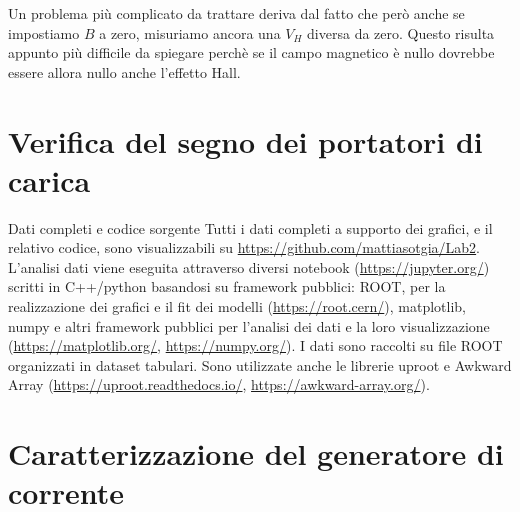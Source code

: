 \documentclass[
    prl,
    reprint, 
    superscriptaddress, 
    altaffilletter, 
    amsmath, 
    amssymb, 
    a4paper,
    varvw]{revtex4-2}
\begin{document}
Un problema più complicato da trattare deriva dal fatto che però anche se impostiamo $B$ a zero, misuriamo ancora una $V_H$ diversa da zero. Questo risulta appunto più difficile da spiegare perchè se il campo magnetico è nullo dovrebbe essere allora nullo anche l'effetto Hall. 





\section{Verifica del segno dei portatori di carica}


\begin{methods}{D\lowercase{ati completi e codice sorgente}}
    Tutti i dati completi a supporto dei grafici, e il relativo codice, sono visualizzabili su \url{https://github.com/mattiasotgia/Lab2}. L'analisi dati viene eseguita attraverso diversi notebook (\url{https://jupyter.org/}) scritti in C++/python basandosi su framework pubblici: ROOT, per la realizzazione dei grafici e il fit dei modelli (\url{https://root.cern/}), matplotlib, numpy e altri framework pubblici per l'analisi dei dati e la loro visualizzazione (\url{https://matplotlib.org/}, \url{https://numpy.org/}). I dati sono raccolti su file ROOT organizzati in dataset tabulari. Sono utilizzate anche le librerie uproot e Awkward Array (\url{https://uproot.readthedocs.io/}, \url{https://awkward-array.org/}).
\end{methods}


\appendix
\section{Caratterizzazione del generatore di corrente}\label{sec:appendix_current_gen}
\end{document}
